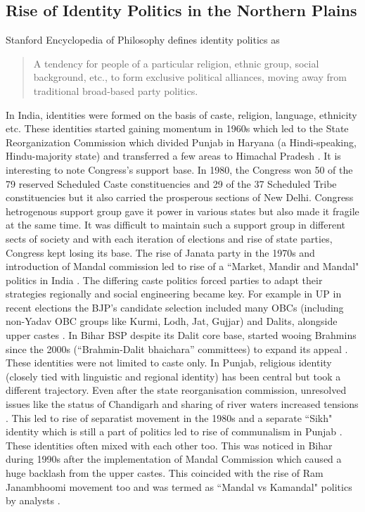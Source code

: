\subsection{Rise of Identity Politics in the Northern Plains}
Stanford Encyclopedia of Philosophy \citep{Heyes_2024} defines identity politics as \begin{quote}
     A tendency for people of a particular religion, ethnic group, social background, etc., to form exclusive political alliances, moving away from traditional broad-based party politics.
 \end{quote}
In India, identities were formed on the basis of caste, religion, language, ethnicity etc. These identities started gaining momentum in 1960s which led to the State Reorganization Commission which divided Punjab in Haryana (a Hindi-speaking, Hindu-majority state) and transferred a few areas to Himachal Pradesh \citep{Punjab_1966_reorg}. It is interesting to note Congress’s support base. In 1980, the Congress won 50 of the 79 reserved Scheduled Caste constituencies and 29 of the 37 Scheduled Tribe constituencies but it also carried the prosperous sections of New Delhi. Congress hetrogenous support group gave it power in various states but also made it fragile at the same time. It was difficult to maintain such a support group in different sects of society and with each
iteration of elections and rise of state parties, Congress kept losing its base. The rise of Janata party in the 1970s and introduction of Mandal commission led to rise of a ``Market, Mandir and Mandal" politics in India \citep{yadav1999electoral}. The differing caste politics forced parties to adapt their strategies regionally and social engineering became key. For example in UP in recent elections the BJP’s candidate selection  included many OBCs (including non-Yadav OBC groups like Kurmi, Lodh, Jat, Gujjar) and Dalits, alongside upper castes \citep{jaffrelot2012castes}. In Bihar BSP despite its Dalit core base, started wooing Brahmins since the 2000s (“Brahmin-Dalit bhaichara” committees) to expand its appeal \citep{ankit2018caste}. These identities were not limited to caste only. In Punjab, religious identity (closely tied with linguistic and regional identity) has been central but took a different trajectory. Even after the state reorganisation commission,  unresolved issues like the status of Chandigarh and sharing of river waters increased tensions \citep{padhiari2008inter}. This led to rise of separatist movement in the 1980s and a separate ``Sikh" identity which is still a part of politics led to rise of communalism in Punjab \citep{gupta1985communalising}. These identities often mixed with each other too. This was noticed in Bihar during 1990s after the implementation of Mandal Commission which caused a huge backlash from the upper castes. This coincided with the rise of Ram Janambhoomi movement too and was termed as ``Mandal vs Kamandal" politics by analysts \citep{roy2024politics}. 


